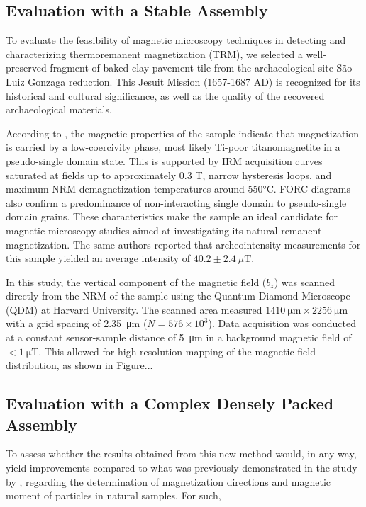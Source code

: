 \subsection{Evaluation with a Stable Assembly}

To evaluate the feasibility of magnetic microscopy techniques in detecting and characterizing thermoremanent magnetization (TRM), we selected a well-preserved fragment of baked clay pavement tile from the archaeological site São Luiz Gonzaga reduction. This Jesuit Mission (1657-1687 AD) is recognized for its historical and cultural significance, as well as the quality of the recovered archaeological materials.

According to \citet{Poletti2016}, the magnetic properties of the sample indicate that magnetization is carried by a low-coercivity phase, most likely Ti-poor titanomagnetite in a pseudo-single domain state. This is supported by IRM acquisition curves saturated at fields up to approximately 0.3 T, narrow hysteresis loops, and maximum NRM demagnetization temperatures around 550°C. FORC diagrams also confirm a predominance of non-interacting single domain to pseudo-single domain grains. These characteristics make the sample an ideal candidate for magnetic microscopy studies aimed at investigating its natural remanent magnetization. The same authors reported that archeointensity measurements for this sample yielded an average intensity of $40.2 \pm 2.4\ \mu\text{T}$.

In this study, the vertical component of the magnetic field ($b_z$) was scanned directly from the NRM of the sample using the Quantum Diamond Microscope (QDM) at Harvard University. The scanned area measured $\qty{1410}{\um} \times \qty{2256}{\um}$ with a grid spacing of \qty{2.35}{\um} ($N = 576 \times 10^{3}$). Data acquisition was conducted at a constant sensor-sample distance of \qty{5}{\um} in a background magnetic field of $< \qty{1}{\micro\tesla}$. This allowed for high-resolution mapping of the magnetic field distribution, as shown in Figure...


\subsection{Evaluation with a Complex Densely Packed Assembly}

To assess whether the results obtained from this new method would, in any way, yield improvements compared to what was previously demonstrated in the study by \citet{Souza-Junior2023b}, regarding the determination of magnetization directions and magnetic moment of particles in natural samples. For such, 


